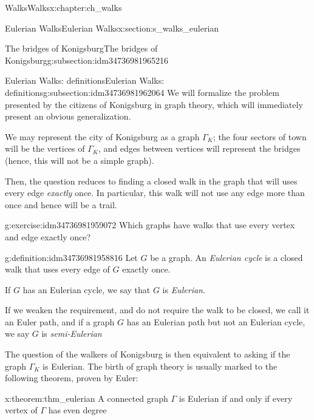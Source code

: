 \documentclass[oneside,10pt,]{book}
\numberwithin{equation}{section}
\begin{document}
\begin{chapterptx}{Walks}{}{Walks}{}{}{x:chapter:ch_walks}
\begin{sectionptx}{Eulerian Walks}{}{Eulerian Walks}{}{}{x:section:s_walks_eulerian}
\begin{subsectionptx}{The bridges of Konigsburg}{}{The bridges of Konigsburg}{}{}{g:subsection:idm34736981965216}
\end{subsectionptx}
%
%
\typeout{************************************************}
\typeout{************************************************}
%
\begin{subsectionptx}{Eulerian Walks: definitions}{}{Eulerian Walks: definitions}{}{}{g:subsection:idm34736981962064}
We will formalize the problem presented by the citizens of Konigsburg in graph theory, which will immediately present an obvious generalization.%
\par
We may represent the city of Konigsburg as a graph \(\Gamma_K\); the four sectors of town will be the vertices of \(\Gamma_K\), and edges between vertices will represent the bridges (hence, this will not be a simple graph).%
\par
Then, the question reduces to finding a closed walk in the graph that will uses every edge \emph{exactly} once. In particular, this walk will not use any edge more than once and hence will be a trail.%
\begin{inlineexercise}{}{g:exercise:idm34736981959072}%
Which graphs have walks that use every vertex and edge exactly once?\end{inlineexercise}
\begin{definition}{}{g:definition:idm34736981958816}%
Let \(G\) be a graph.  An \emph{Eulerian cycle} is a closed walk that uses every edge of \(G\) exactly once.%
\par
If \(G\) has an Eulerian cycle, we say that \(G\) is \emph{Eulerian}.%
\par
If we weaken the requirement, and do not require the walk to be closed, we call it an Euler path, and if a graph \(G\) has an Eulerian path but not an Eulerian cycle, we say \(G\) is \emph{semi-Eulerian}%
\end{definition}
The question of the walkers of Konigsburg is then equivalent to asking if the graph \(\Gamma_K\) is Eulerian. The birth of graph theory is usually marked to the following theorem, proven by Euler:%
\begin{theorem}{}{}{x:theorem:thm_eulerian}%
A connected graph \(\Gamma\) is Eulerian if and only if every vertex of \(\Gamma\) has even degree%
\end{theorem}
\end{subsectionptx}
%
%
\typeout{************************************************}
\typeout{************************************************}

\end{sectionptx}
\end{chapterptx}
\end{document}

